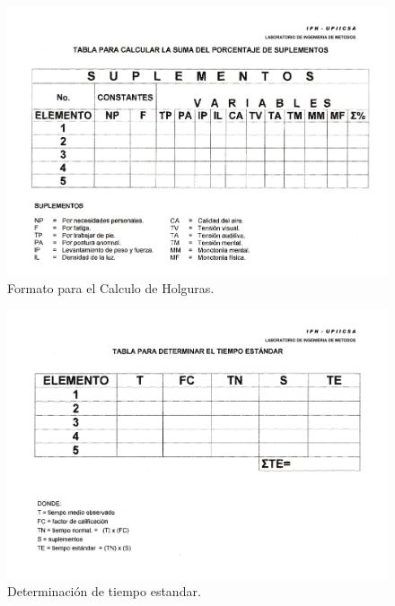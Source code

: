      \begin{figure}[H]
        \centering
        \includegraphics[scale=0.3]{15/img/tablaCalculoHolguras.pdf}
        \caption{Formato para el Calculo de Holguras.}
        \label{fig:tablaCalculoHolguras}
    \end{figure}
    
      \begin{figure}[H]
        \centering
        \includegraphics[scale=0.3]{15/img/tablaTiempoEstandar.pdf}
        \caption{Determinación de tiempo estandar.}
        \label{fig:tiempoEstandar}
    \end{figure}
     
    
